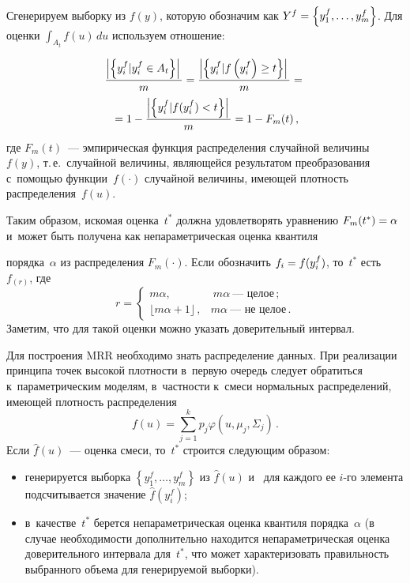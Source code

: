 \begin{multicols}{2}
     Сгенерируем выборку из $f(y)$, которую обозначим как $Y^f\hm= \left\{ 
y_1^f, \ldots, y_m^f\right\}$. Для оценки $\int\nolimits_{A_t} f(u)\,du$ 
используем отношение:

\noindent
\begin{multline*}
     \displaystyle\frac{\displaystyle \left\vert \left\{ y_i^f\vert y_i^f\in A_t\right\}\right\vert \mathstrut}{\displaystyle m\mathstrut} =
      \displaystyle\frac{\displaystyle \left\vert\left\{ y_i^f\vert 
f\left(y_i^f\right) \geq t\right\}\right\vert \mathstrut}{\displaystyle m\mathstrut} ={}\\
{}= 1-\displaystyle\frac{\displaystyle \left\vert \left\{ y_i^f\vert f(y_i^f)<t\right\}\right\vert \mathstrut}{\displaystyle m\mathstrut}=1-
F_m(t)\,,
     \end{multline*}
где $F_m(t)$~--- эмпирическая функция распределения случайной 
величины~$f(y)$, т.\,е.\ случайной величины, являющейся результатом 
преобразования с~помощью функции~$f(\cdot)$ случайной величины, име\-ющей 
плотность распределения~$f(u)$.

     Таким образом, искомая оценка~$t^*$ должна удовле\-тво\-рять уравнению 
$F_m(t^*)\hm=\alpha$ и~может быть получена как непараметрическая оценка 
квантиля\linebreak\vspace*{-12pt}

\pagebreak

\noindent
 порядка~$\alpha$ из распределения $F_m(\cdot)$. Если обозначить 
$f_i\hm= f(y_i^f)$, то~$t^*$ есть~$f_{(r)}$, где
     $$
     r= \begin{cases}
     m\alpha, &\ m\alpha~\mbox{---~целое}\,;\\
     \lfloor m\alpha+1\rfloor\,, & m\alpha~\mbox{--- не целое}\,.
     \end{cases}
     $$
     Заметим, что для такой оценки можно указать доверительный интервал.
     
     Для построения MRR необходимо знать распределение данных. При 
реализации принципа точек высокой плотности в~первую очередь следует 
обратиться к~параметрическим моделям, в~част\-ности к~смеси нормальных 
распределений, име\-ющей плотность распределения
     $$
     f(u) =\sum\limits_{j=1}^k p_j \varphi\left (u,\mu_j, \Sigma_j\right)\,.
     $$
Если $\hat{f}(u)$~--- оценка смеси, то~$t^*$ строится сле\-ду\-ющим образом:
\begin{itemize}
\item генерируется выборка $\left\{ y_1^f,\ldots , y_m^f\right\}$ из $\hat{f}(u)$ и~
для каждого ее $i$-го элемента подсчитывается значение $\hat{f}\left( 
y_i^f\right)$;
\item в~качестве~$t^*$ берется непараметрическая оценка квантиля 
порядка~$\alpha$ (в случае необходимости дополнительно находится 
непараметрическая оценка доверительного интервала для~$t^*$, что 
может характеризовать правильность выбранного объема для 
генерируемой выборки).
\end{itemize}


\end{multicols}
